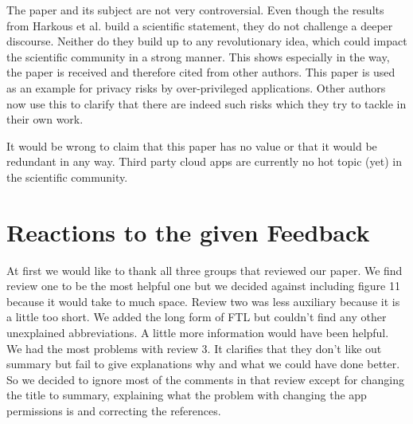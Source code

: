 \documentclass[11pt,twocolumn,a4paper,DIV=calc]{scrartcl}
\begin{document}
The paper and its subject are not very controversial. Even though the results from Harkous et al. build a scientific statement, they do not challenge a deeper discourse. Neither do they build up to any revolutionary idea, which could impact the scientific community in a strong manner. This shows especially in the way, the paper is received and therefore cited from other authors. This paper is used as an example for privacy risks by over-privileged applications.
Other authors now use this to clarify that there are indeed such risks which they try to tackle in their own work.

It would be wrong to claim that this paper has no value or that it would be redundant in any way. Third party cloud apps are currently no hot topic (yet) in the scientific community.
\section{Reactions to the given Feedback} 
At first we would like to thank all three groups that reviewed our paper. We find review one to be the most helpful one but we decided against including figure 11 because it would take to much space. Review two was less auxiliary because it is a little too short. We added the long form of FTL but couldn't find any other unexplained abbreviations. A little more information would have been helpful. We had the most problems with review 3. It clarifies that they don't like out summary but fail to give explanations why and what we could have done better. So we decided to ignore most of the comments in that review except for changing the title to summary, explaining what the problem with changing the app permissions is and correcting the references. 
\end{document}
